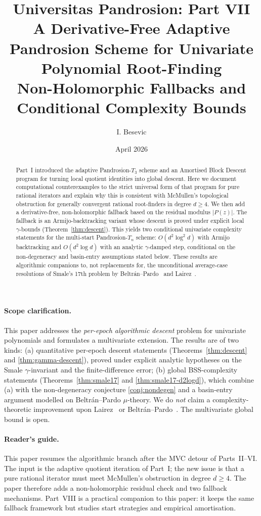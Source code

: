 \documentclass[11pt,a4paper]{article}
\title{Universitas Pandrosion: Part VII \\ A Derivative-Free Adaptive Pandrosion Scheme for Univariate Polynomial Root-Finding \\ Non-Holomorphic Fallbacks and Conditional Complexity Bounds}
\author{I. Besevic}
\date{April 2026}
\begin{document}
\maketitle

\begin{abstract}
Part~I introduced the adaptive Pandrosion-$T_3$ scheme and an Amortised Block
Descent program for turning local quotient identities into global descent. Here
we document computational counterexamples to the strict universal form of that
program for pure rational iterators and
explain why this is consistent with McMullen's topological obstruction for
generally convergent rational root-finders in degree $d\ge4$. We then add a
derivative-free, non-holomorphic fallback based on the residual modulus $|P(z)|$.
The fallback is an Armijo-backtracking variant whose descent is proved under
explicit local $\gamma$-bounds (Theorem~\ref{thm:descent}). This yields two
conditional univariate complexity statements for the multi-start
Pandrosion-$T_n$ scheme: $O(d^2\log^2 d)$ with Armijo backtracking and
$O(d^2\log d)$ with an analytic $\gamma$-damped step, conditional on the
non-degeneracy and basin-entry assumptions stated below. These results are
algorithmic companions to, not replacements for, the unconditional average-case
resolutions of Smale's 17th problem by Beltr\'an--Pardo~\cite{beltranpardo} and
Lairez~\cite{lairez}.
\end{abstract}

\paragraph{Scope clarification.} This paper addresses the \emph{per-epoch algorithmic descent} problem for univariate polynomials and formulates a multivariate extension. The results are of two kinds: (a) quantitative per-epoch descent statements (Theorems~\ref{thm:descent} and \ref{thm:gamma-descent}), proved under explicit analytic hypotheses on the Smale $\gamma$-invariant and the finite-difference error; (b) global BSS-complexity statements (Theorems~\ref{thm:smale17} and \ref{thm:smale17-d2logd}), which combine (a) with the non-degeneracy conjecture \ref{conj:nondegen} and a basin-entry argument modelled on Beltr\'an--Pardo $\mu$-theory. We do \emph{not} claim a complexity-theoretic improvement upon Lairez~\cite{lairez} or Beltr\'an--Pardo~\cite{beltranpardo}. The multivariate global bound is open.

\paragraph{Reader's guide.}
This paper resumes the algorithmic branch after the MVC detour of Parts~II--VI.
The input is the adaptive quotient iteration of Part~I; the new issue is that a
pure rational iterator must meet McMullen's obstruction in degree $d\ge4$.
The paper therefore adds a non-holomorphic residual check and two fallback
mechanisms. Part~VIII is a practical companion to this paper: it keeps the same
fallback framework but studies start strategies and empirical amortisation.
\end{document}
